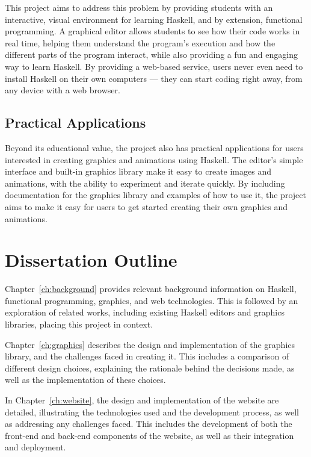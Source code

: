 \documentclass[../main.tex]{subfiles}
\begin{document}
            This project aims to address this problem by providing students with an
                interactive, visual environment for learning Haskell, and by extension,
                functional programming.
            A graphical editor allows students to see how their code works in real time,
                helping them understand the program's execution and how the different parts of
                the program interact, while also providing a fun and engaging way to learn
                Haskell.
            By providing a web-based service, users never even need to install Haskell on
                their own computers — they can start coding right away, from any device with a
                web browser.

        \subsection{Practical Applications}
            Beyond its educational value, the project also has practical applications for
                users interested in creating graphics and animations using Haskell.
            The editor's simple interface and built-in graphics library make it easy to
                create images and animations, with the ability to experiment and iterate
                quickly.
            By including documentation for the graphics library and examples of how to use
                it, the project aims to make it easy for users to get started creating their
                own graphics and animations.

    \section{Dissertation Outline}
        Chapter~\ref{ch:background} provides relevant background information on
            Haskell, functional programming, graphics, and web technologies.
        This is followed by an exploration of related works, including existing Haskell
            editors and graphics libraries, placing this project in context.

        Chapter~\ref{ch:graphics} describes the design and implementation of the
            graphics library, and the challenges faced in creating it.
        This includes a comparison of different design choices, explaining the
            rationale behind the decisions made, as well as the implementation of these
            choices.

        In Chapter~\ref{ch:website}, the design and implementation of the website are
            detailed, illustrating the technologies used and the development process, as
            well as addressing any challenges faced.
        This includes the development of both the front-end and back-end components of
            the website, as well as their integration and deployment.
\end{document}
